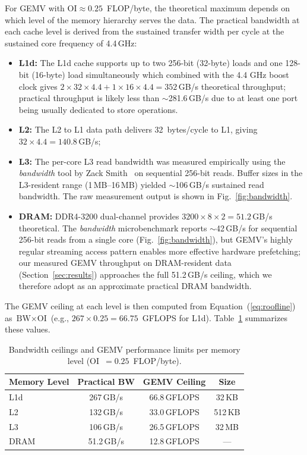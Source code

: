 \documentclass[conference]{IEEEtran}
\begin{document}
For GEMV with $\text{OI} \approx 0.25$~FLOP/byte, the theoretical maximum
depends on which level of the memory hierarchy serves the data. The practical
bandwidth at each cache level is derived from the sustained transfer width per
cycle at the sustained core frequency of 4.4\,GHz:
\begin{itemize}
  \item \textbf{L1d:} The L1d cache supports up to two 256-bit (32-byte) loads and one 128-bit (16-byte) load simultaneously which combined with the 4.4 GHz boost clock gives
      $2 \times 32 \times 4.4 + 1 \times 16 \times 4.4 = 352$\,GB/s theoretical throughput; practical
      throughput is likely less than $\sim$281.6\,GB/s due to at least one port being usually dedicated to store operations.\cite{amdsog}
\item \textbf{L2:} The L2 to L1 data path delivers 32~bytes/cycle to L1, giving
  $32 \times 4.4 = 140.8$\,GB/s;\cite{amdsog}
\item \textbf{L3:} The per-core L3 read bandwidth was measured empirically using
      the \textit{bandwidth} tool by Zack Smith~\cite{bandwidth} on sequential
      256-bit reads. Buffer sizes in the L3-resident range (1\,MB--16\,MB)
      yielded $\sim$106\,GB/s sustained read bandwidth. The raw measurement
      output is shown in Fig.~\ref{fig:bandwidth}.
\item \textbf{DRAM:} DDR4-3200 dual-channel provides
      $3200 \times 8 \times 2 = 51.2$\,GB/s theoretical. The
      \textit{bandwidth} microbenchmark reports $\sim$42\,GB/s for
      sequential 256-bit reads from a single core
      (Fig.~\ref{fig:bandwidth}), but GEMV's highly regular streaming
      access pattern enables more effective hardware prefetching; our
      measured GEMV throughput on DRAM-resident data
      (Section~\ref{sec:results}) approaches the full 51.2\,GB/s
      ceiling, which we therefore adopt as an approximate practical DRAM
      bandwidth.
\end{itemize}
The GEMV ceiling at each level is then computed from Equation~(\ref{eq:roofline})
as $\text{BW} \times \text{OI}$ (e.g., $267 \times 0.25 = 66.75$~GFLOPS for
L1d). Table~\ref{tab:ceilings} summarizes these values.


\begin{table}[tbp]
\centering
\caption{Bandwidth ceilings and GEMV performance limits per memory level
(OI~$= 0.25$~FLOP/byte).}
\label{tab:ceilings}
\begin{tabular}{@{}l c c c@{}}
\toprule
\textbf{Memory Level} & \textbf{Practical BW} &
  \textbf{GEMV Ceiling} & \textbf{Size} \\
\midrule
L1d   & 267\,GB/s  & 66.8\,GFLOPS & 32\,KB  \\
L2    & 132\,GB/s  & 33.0\,GFLOPS & 512\,KB \\
L3    & 106\,GB/s  & 26.5\,GFLOPS & 32\,MB  \\
DRAM  & 51.2\,GB/s & 12.8\,GFLOPS & ---     \\
\bottomrule
\end{tabular}
\end{table}
\end{document}
